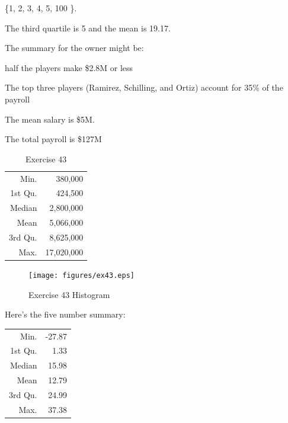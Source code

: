 \documentclass[letterpaper, landscape]{exam}
\begin{document}
\begin{description}
        \{1, 2, 3, 4, 5, 100 \}.  
        
        The third quartile is 5 and the mean is 19.17.

      \item[43]

        The summary for the owner might be:
        \begin{itemize*}
          \item half the players make \$2.8M or less
          \item The top three players (Ramirez, Schilling, and Ortiz) account
            for 35\% of the payroll
          \item The mean salary is \$5M.
          \item The total payroll is \$127M
        \end{itemize*}

        \begin{table}[H]
          \centering
          \begin{tabular}{rr}
            \toprule
            Min.    & 380,000 \\
            1st Qu. & 424,500 \\
            Median  & 2,800,000 \\
            Mean    & 5,066,000 \\
            3rd Qu. & 8,625,000 \\
            Max.    & 17,020,000 \\
            \bottomrule
          \end{tabular}
          \caption{Exercise 43}
        \end{table}
        \begin{figure}[H]
          \centering
          \texttt{[image: figures/ex43.eps]}
          \caption{Exercise 43 Histogram}
        \end{figure}


      \item[44]
        Here's the five number summary:

        \begin{table}[H]
          \centering
          \begin{tabular}{rr}
            \toprule
            Min.    & -27.87 \\
            1st Qu. & 1.33 \\
            Median  & 15.98 \\
            Mean    & 12.79 \\
            3rd Qu. & 24.99 \\
            Max.    & 37.38 \\
            \bottomrule
          \end{tabular}
        \end{table}


\end{description}
\end{document}
